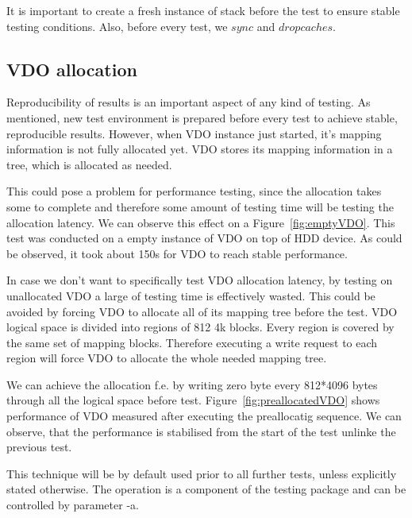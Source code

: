 \documentclass[
  color, %
  table, %
  lof,   %
  lot,   %
]{fithesis3}
\begin{document}
It is important to create a fresh instance of stack before the test to ensure stable testing conditions. Also, before every test, we $sync$ and $drop caches$. 

\subsection{VDO allocation}
\label{alloc}
Reproducibility of results is an important aspect of any kind of testing. As mentioned, new test environment is prepared before every test to achieve stable, reproducible results. However, when VDO instance just started, it's mapping information is not fully allocated yet. VDO stores its mapping information in a tree, which is allocated as needed.

This could pose a problem for performance testing, since the allocation takes some to complete and therefore some amount of testing time will be testing the allocation latency. We can observe this effect on a Figure~\ref{fig:emptyVDO}. This test was conducted on a empty instance of VDO on top of HDD device. As could be observed, it took about 150s for VDO to reach stable performance.

In case we don't want to specifically test VDO allocation latency, by testing on unallocated VDO a large of testing time is effectively wasted. This could be avoided by forcing VDO to allocate all of its mapping tree before the test. VDO logical space is divided into regions of 812 4k blocks. Every region is covered by the same set of mapping blocks. Therefore executing a write request to each region will force VDO to allocate the whole needed mapping tree. 

We can achieve the allocation f.e. by writing zero byte every 812*4096 bytes through all the logical space before test. Figure~\ref{fig:preallocatedVDO} shows performance of VDO measured after executing the preallocatig sequence. We can observe, that the performance is stabilised from the start of the test unlinke the previous test.

This technique will be by default used prior to all further tests, unless explicitly stated otherwise. The operation is a component of the testing package and can be controlled by parameter -a.
\end{document}
